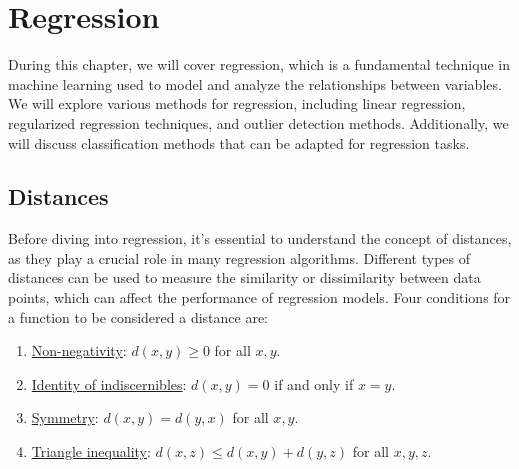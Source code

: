 \chapter{Regression}

During this chapter, we will cover regression, which is a fundamental technique in machine learning used to model and analyze the relationships between variables. We will explore various methods for regression, including linear regression, regularized regression techniques, and outlier detection methods. Additionally, we will discuss classification methods that can be adapted for regression tasks.

\section{Distances}

Before diving into regression, it's essential to understand the concept of distances, as they play a crucial role in many regression algorithms. Different types of distances can be used to measure the similarity or dissimilarity between data points, which can affect the performance of regression models. Four conditions for a function to be considered a distance are:
\begin{enumerate}
    \item \ul{Non-negativity}: $d(x, y) \geq 0$ for all $x, y$.
    \item \ul{Identity of indiscernibles}: $d(x, y) = 0$ if and only if $x = y$.
    \item \ul{Symmetry}: $d(x, y) = d(y, x)$ for all $x, y$.
    \item \ul{Triangle inequality}: $d(x, z) \leq d(x, y) + d(y, z)$ for all $x, y, z$.
\end{enumerate}

